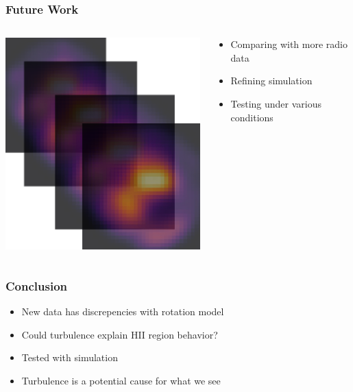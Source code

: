 \documentclass[aspectratio=169,compress]{beamer}
\begin{document}
\begin{frame}
  \frametitle{Future Work}
  \begin{columns}
    \begin{column}{0.5\linewidth}
      \includegraphics[width=0.7\linewidth]{figures/lagslides.png}
    \end{column}
    \begin{column}{0.5\linewidth}
      \begin{itemize}
        \item Comparing with more radio data
        \item Refining simulation
        \item Testing under various conditions
      \end{itemize}
    \end{column}
  \end{columns}
\end{frame}

\begin{frame}
  \frametitle{Conclusion}
  \begin{itemize}
    \item New data has discrepencies with rotation model
    \item Could turbulence explain HII region behavior?
    \item Tested with simulation
    \item Turbulence is a potential cause for what we see
  \end{itemize}
\end{frame}

\end{document}
